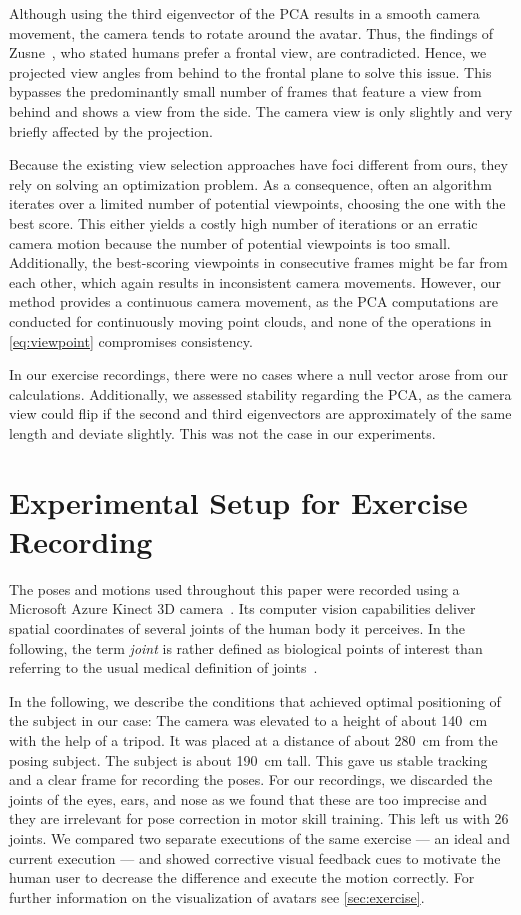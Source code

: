 Although using the third eigenvector of the PCA results in a smooth camera movement, the camera tends to rotate around the avatar. Thus, the findings of Zusne~\cite{zusne1970vpf}, who stated humans prefer a frontal view, are contradicted. Hence, we projected view angles from behind to the frontal plane to solve this issue. This bypasses the predominantly small number of frames that feature a view from behind and shows a view from the side. The camera view is only slightly and very briefly affected by the projection.

Because the existing view selection approaches have foci different from ours, they rely on solving an optimization problem. As a consequence, often an algorithm iterates over a limited number of potential viewpoints, choosing the one with the best score. This either yields a costly high number of iterations or an erratic camera motion because the number of potential viewpoints is too small. Additionally, the best-scoring viewpoints in consecutive frames might be far from each other, which again results in inconsistent camera movements. However, our method provides a continuous camera movement, as the PCA computations are conducted for continuously moving point clouds, and none of the operations in \autoref{eq:viewpoint} compromises consistency.

In our exercise recordings, there were no cases where a null vector arose from our calculations. Additionally, we assessed stability regarding the PCA, as the camera view could flip if the second and third eigenvectors are approximately of the same length and deviate slightly. This was not the case in our experiments.

\section{Experimental Setup for Exercise Recording \label{sec:recording}}
The poses and motions used throughout this paper were recorded using a Microsoft Azure Kinect 3D camera~\cite{kinect:documentation}. Its computer vision capabilities deliver spatial coordinates of several joints of the human body it perceives. In the following, the term \emph{joint} is rather defined as biological points of interest than referring to the usual medical definition of joints~\cite{kinect:documentation}.

In the following, we describe the conditions that achieved optimal positioning of the subject in our case: The camera was elevated to a height of about 140~cm with the help of a tripod. It was placed at a distance of about 280~cm from the posing subject. The subject is about 190~cm tall. This gave us stable tracking and a clear frame for recording the poses. For our recordings, we discarded the joints of the eyes, ears, and nose as we found that these are too imprecise and they are irrelevant for pose correction in motor skill training. This left us with 26 joints. We compared two separate executions of the same exercise --- an ideal and current execution --- and showed corrective visual feedback cues to motivate the human user to decrease the difference and execute the motion correctly. For further information on the visualization of avatars see \autoref{sec:exercise}.

